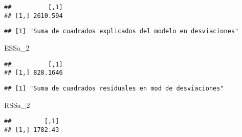 \documentclass[
]{article}
\newenvironment{Shaded}{\begin{snugshade}}{\end{snugshade}}
\newcommand{\CommentTok}[1]{\textcolor[rgb]{0.56,0.35,0.01}{\textit{#1}}}
\newcommand{\DecValTok}[1]{\textcolor[rgb]{0.00,0.00,0.81}{#1}}
\newcommand{\KeywordTok}[1]{\textcolor[rgb]{0.13,0.29,0.53}{\textbf{#1}}}
\newcommand{\NormalTok}[1]{#1}
\newcommand{\OperatorTok}[1]{\textcolor[rgb]{0.81,0.36,0.00}{\textbf{#1}}}
\newcommand{\StringTok}[1]{\textcolor[rgb]{0.31,0.60,0.02}{#1}}
\begin{document}
\begin{verbatim}
##          [,1]
## [1,] 2610.594
\end{verbatim}

\begin{Shaded}
\end{Shaded}

\begin{verbatim}
## [1] "Suma de cuadrados explicados del modelo en desviaciones"
\end{verbatim}

\begin{Shaded}
\begin{Highlighting}[]
\NormalTok{ESSa_}\DecValTok{2}
\end{Highlighting}
\end{Shaded}

\begin{verbatim}
##          [,1]
## [1,] 828.1646
\end{verbatim}

\begin{Shaded}
\end{Shaded}

\begin{verbatim}
## [1] "Suma de cuadrados residuales en mod de desviaciones"
\end{verbatim}

\begin{Shaded}
\begin{Highlighting}[]
\NormalTok{RSSa_}\DecValTok{2}
\end{Highlighting}
\end{Shaded}

\begin{verbatim}
##         [,1]
## [1,] 1782.43
\end{verbatim}
\end{document}
